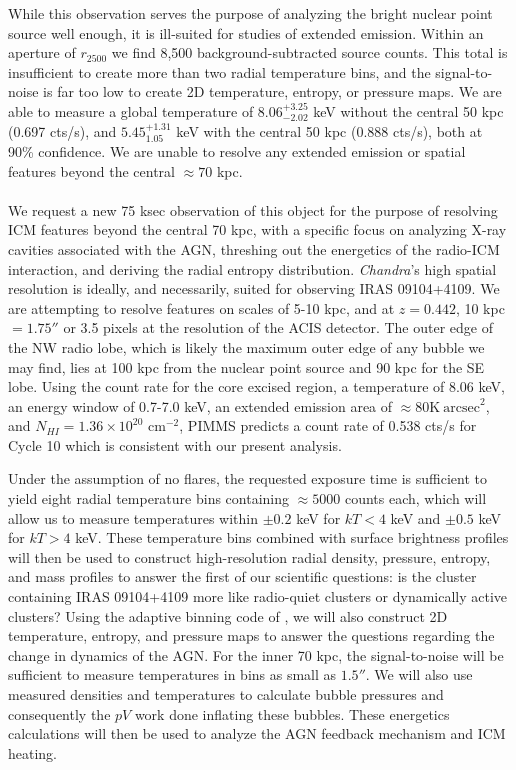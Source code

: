 \documentclass[letterpaper,11pt,twocolumn]{article}
\begin{document}
While this observation serves the purpose of analyzing the bright
nuclear point source well enough, it is ill-suited for studies of
extended emission. Within an aperture of $r_{2500}$ we find 8,500
background-subtracted source counts. This total is insufficient to
create more than two radial temperature bins, and the signal-to-noise
is far too low to create 2D temperature, entropy, or pressure maps. We
are able to measure a global temperature of $8.06^{+3.25}_{-2.02}$ keV
without the central 50 kpc (0.697 cts/s), and $5.45^{+1.31}_{1.05}$
keV with the central 50 kpc (0.888 cts/s), both at 90\% confidence. We
are unable to resolve any extended emission or spatial features beyond
the central $\approx 70$ kpc.\\

\\
We request a new 75 ksec observation of this object for
the purpose of resolving ICM features beyond the central 70 kpc, with
a specific focus on analyzing X-ray cavities associated with the AGN,
threshing out the energetics of the radio-ICM interaction, and
deriving the radial entropy distribution. {\it{Chandra}}'s high
spatial resolution is ideally, and necessarily, suited for observing
IRAS 09104+4109. We are attempting to resolve features on scales of
5-10 kpc, and at $z=0.442$, 10 kpc$=1.75''$ or 3.5 pixels at the
resolution of the ACIS detector. The outer edge of the NW radio lobe,
which is likely the maximum outer edge of any bubble we may find, lies
at 100 kpc from the nuclear point source and 90 kpc for the SE
lobe. Using the count rate for the core excised region, a temperature
of 8.06 keV, an energy window of 0.7-7.0 keV, an extended emission
area of $\approx80\mathrm{K~arcsec}^2$, and $N_{HI} = 1.36\times10^{20}$
cm$^{-2}$, PIMMS predicts a count rate of 0.538 cts/s for Cycle 10
which is consistent with our present analysis.

Under the assumption of no flares, the requested exposure time is
sufficient to yield eight radial temperature bins containing $\approx
5000$ counts each, which will allow us to measure temperatures within
$\pm0.2$ keV for $kT < 4$ keV and $\pm0.5$ keV for $kT > 4$ keV. These
temperature bins combined with surface brightness profiles will then
be used to construct high-resolution radial density, pressure,
entropy, and mass profiles to answer the first of our
scientific questions: is the cluster containing IRAS 09104+4109 more
like radio-quiet clusters or dynamically active clusters?
Using the adaptive binning code of \cite{2006MNRAS.368..497D}, we
will also construct 2D temperature, entropy, and pressure maps to
answer the questions regarding the change in dynamics of the AGN. For
the inner 70 kpc, the signal-to-noise will be sufficient to measure
temperatures in bins as small as $1.5''$. We will also use measured
densities and temperatures to calculate bubble pressures and
consequently the $pV$ work done inflating these bubbles. These
energetics calculations will then be used to analyze the AGN feedback
mechanism and ICM heating.
\end{document}
